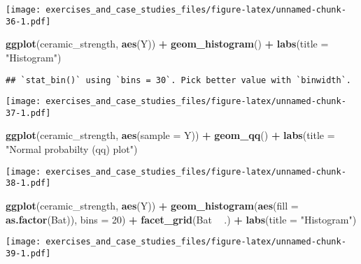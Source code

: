 \documentclass[]{book}
\newenvironment{Shaded}{\begin{snugshade}}{\end{snugshade}}
\newcommand{\DataTypeTok}[1]{\textcolor[rgb]{0.13,0.29,0.53}{#1}}
\newcommand{\DecValTok}[1]{\textcolor[rgb]{0.00,0.00,0.81}{#1}}
\newcommand{\KeywordTok}[1]{\textcolor[rgb]{0.13,0.29,0.53}{\textbf{#1}}}
\newcommand{\NormalTok}[1]{#1}
\newcommand{\OperatorTok}[1]{\textcolor[rgb]{0.81,0.36,0.00}{\textbf{#1}}}
\newcommand{\StringTok}[1]{\textcolor[rgb]{0.31,0.60,0.02}{#1}}
\theoremstyle{definition}
\theoremstyle{definition}
\theoremstyle{definition}
\theoremstyle{remark}
\begin{document}
\texttt{[image: exercises\_and\_case\_studies\_files/figure-latex/unnamed-chunk-36-1.pdf]}

\begin{Shaded}
\begin{Highlighting}[]
\KeywordTok{ggplot}\NormalTok{(ceramic_strength, }\KeywordTok{aes}\NormalTok{(Y)) }\OperatorTok{+}
\StringTok{  }\KeywordTok{geom_histogram}\NormalTok{() }\OperatorTok{+}
\StringTok{  }\KeywordTok{labs}\NormalTok{(}\DataTypeTok{title =} \StringTok{"Histogram"}\NormalTok{)}
\end{Highlighting}
\end{Shaded}

\begin{verbatim}
## `stat_bin()` using `bins = 30`. Pick better value with `binwidth`.
\end{verbatim}

\texttt{[image: exercises\_and\_case\_studies\_files/figure-latex/unnamed-chunk-37-1.pdf]}

\begin{Shaded}
\begin{Highlighting}[]
\KeywordTok{ggplot}\NormalTok{(ceramic_strength, }\KeywordTok{aes}\NormalTok{(}\DataTypeTok{sample =}\NormalTok{ Y)) }\OperatorTok{+}
\StringTok{  }\KeywordTok{geom_qq}\NormalTok{() }\OperatorTok{+}
\StringTok{  }\KeywordTok{labs}\NormalTok{(}\DataTypeTok{title =} \StringTok{"Normal probabilty (qq) plot"}\NormalTok{)}
\end{Highlighting}
\end{Shaded}

\texttt{[image: exercises\_and\_case\_studies\_files/figure-latex/unnamed-chunk-38-1.pdf]}

\begin{Shaded}
\begin{Highlighting}[]
\KeywordTok{ggplot}\NormalTok{(ceramic_strength, }\KeywordTok{aes}\NormalTok{(Y)) }\OperatorTok{+}
\StringTok{  }\KeywordTok{geom_histogram}\NormalTok{(}\KeywordTok{aes}\NormalTok{(}\DataTypeTok{fill =} \KeywordTok{as.factor}\NormalTok{(Bat)), }\DataTypeTok{bins =} \DecValTok{20}\NormalTok{) }\OperatorTok{+}
\StringTok{  }\KeywordTok{facet_grid}\NormalTok{(Bat }\OperatorTok{~}\StringTok{ }\NormalTok{.) }\OperatorTok{+}
\StringTok{  }\KeywordTok{labs}\NormalTok{(}\DataTypeTok{title =} \StringTok{"Histogram"}\NormalTok{)}
\end{Highlighting}
\end{Shaded}

\texttt{[image: exercises\_and\_case\_studies\_files/figure-latex/unnamed-chunk-39-1.pdf]}
\end{document}
